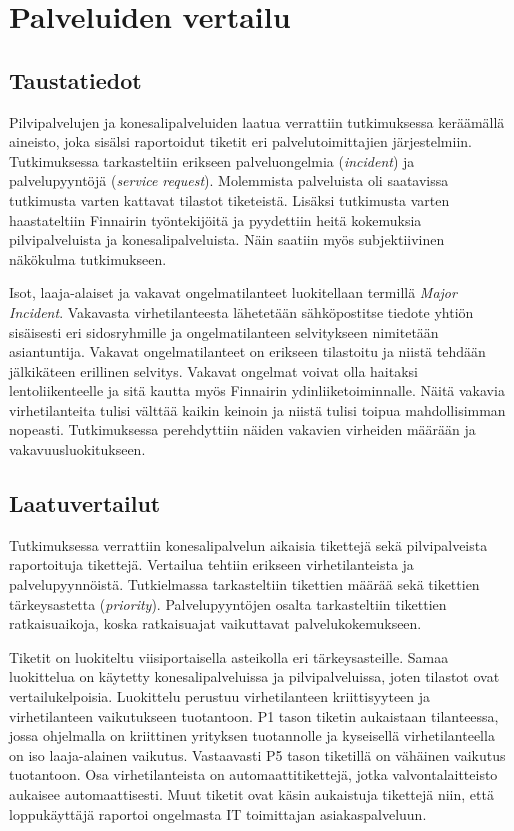 \chapter{Palveluiden vertailu\label{vertailu}}

\section{Taustatiedot}
Pilvipalvelujen ja konesalipalveluiden laatua verrattiin tutkimuksessa keräämällä aineisto, joka sisälsi raportoidut tiketit eri palvelutoimittajien järjestelmiin. Tutkimuksessa tarkasteltiin erikseen palveluongelmia (\emph{incident}) ja palvelupyyntöjä (\emph{service request}). Molemmista palveluista oli saatavissa tutkimusta varten kattavat tilastot tiketeistä. Lisäksi tutkimusta varten haastateltiin Finnairin työntekijöitä ja pyydettiin heitä kokemuksia pilvipalveluista ja konesalipalveluista. Näin saatiin myös subjektiivinen näkökulma tutkimukseen.

Isot, laaja-alaiset ja vakavat ongelmatilanteet luokitellaan termillä \emph{Major Incident}. Vakavasta virhetilanteesta lähetetään sähköpostitse tiedote yhtiön sisäisesti eri sidosryhmille ja ongelmatilanteen selvitykseen nimitetään asiantuntija. Vakavat ongelmatilanteet on erikseen tilastoitu ja niistä tehdään jälkikäteen erillinen selvitys. Vakavat ongelmat voivat olla haitaksi lentoliikenteelle ja sitä kautta myös Finnairin ydinliiketoiminnalle. Näitä vakavia virhetilanteita tulisi välttää kaikin keinoin ja niistä tulisi toipua mahdollisimman nopeasti. Tutkimuksessa perehdyttiin näiden vakavien virheiden määrään ja vakavuusluokitukseen.

\section{Laatuvertailut}
Tutkimuksessa verrattiin konesalipalvelun aikaisia tikettejä sekä pilvipalveista raportoituja tikettejä. Vertailua tehtiin erikseen virhetilanteista ja palvelupyynnöistä. Tutkielmassa tarkasteltiin tikettien määrää sekä tikettien tärkeysastetta (\emph{priority}). Palvelupyyntöjen osalta tarkasteltiin tikettien ratkaisuaikoja, koska ratkaisuajat vaikuttavat palvelukokemukseen.

Tiketit on luokiteltu viisiportaisella asteikolla eri tärkeysasteille. Samaa luokittelua on käytetty konesalipalveluissa ja pilvipalveluissa, joten tilastot ovat vertailukelpoisia. Luokittelu perustuu virhetilanteen kriittisyyteen ja virhetilanteen vaikutukseen tuotantoon. P1 tason tiketin aukaistaan tilanteessa, jossa ohjelmalla on kriittinen yrityksen tuotannolle ja kyseisellä virhetilanteella on iso laaja-alainen vaikutus. Vastaavasti P5 tason tiketillä on vähäinen vaikutus tuotantoon. Osa virhetilanteista on automaattitikettejä, jotka valvontalaitteisto aukaisee automaattisesti. Muut tiketit ovat käsin aukaistuja tikettejä niin, että loppukäyttäjä raportoi ongelmasta IT toimittajan asiakaspalveluun. 

